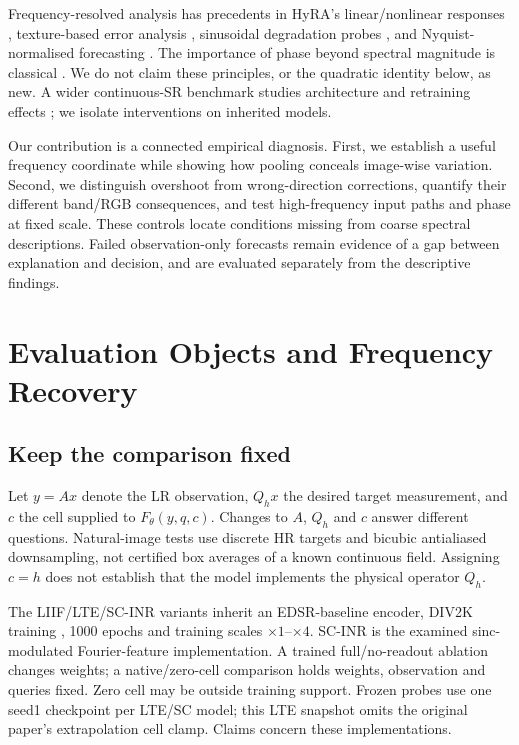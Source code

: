 Frequency-resolved analysis has precedents in HyRA's linear/nonlinear
responses \cite{fsds2024}, texture-based error analysis
\cite{magid2022texture}, sinusoidal degradation probes
\cite{kawai2026frequency}, and Nyquist-normalised forecasting
\cite{wang2026scaleanchoring}. The importance of phase beyond spectral
magnitude is classical \cite{oppenheim1981phase}. We do not claim these
principles, or the quadratic identity below, as new. A wider continuous-SR
benchmark studies architecture and retraining effects
\cite{nasir2026empirical}; we isolate interventions on inherited models.

Our contribution is a connected empirical diagnosis. First, we establish
a useful frequency coordinate while showing how pooling conceals
image-wise variation. Second, we distinguish overshoot from wrong-direction
corrections, quantify their different band/RGB consequences, and test
high-frequency input paths and phase at fixed scale. These controls locate
conditions missing from coarse spectral descriptions. Failed observation-only
forecasts remain evidence of a gap between explanation and decision,
and are evaluated separately from the descriptive findings.

\section{Evaluation Objects and Frequency Recovery}
\label{sec:recovery}
\subsection{Keep the comparison fixed}
Let $y=Ax$ denote the LR observation, $Q_hx$ the desired target measurement,
and $c$ the cell supplied to $F_\theta(y,q,c)$. Changes to $A$, $Q_h$ and
$c$ answer different questions. Natural-image tests use discrete HR targets
and bicubic antialiased downsampling, not certified box averages of a
known continuous field. Assigning $c=h$ does not establish that the model
implements the physical operator $Q_h$.

The LIIF/LTE/SC-INR variants inherit an EDSR-baseline encoder, DIV2K
training \cite{agustsson2017div2k}, 1000 epochs and training scales
$\times1$--$\times4$. SC-INR is the examined sinc-modulated Fourier-feature
implementation. A trained full/no-readout ablation changes weights;
a native/zero-cell comparison holds weights, observation and queries
fixed. Zero cell may be outside training support. Frozen probes use one
seed1 checkpoint per LTE/SC model; this LTE snapshot omits the original
paper's extrapolation cell clamp. Claims concern these implementations.

